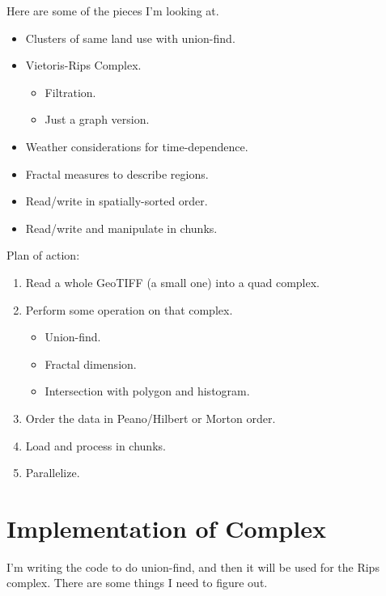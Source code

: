 \documentclass{article}
\begin{document}
Here are some of the pieces I'm looking at.

\begin{itemize}

  \item Clusters of same land use with union-find.

  \item Vietoris-Rips Complex.
  \begin{itemize}
    \item Filtration.
    \item Just a graph version.
  \end{itemize}

  \item Weather considerations for time-dependence.

  \item Fractal measures to describe regions.

  \item Read/write in spatially-sorted order.

  \item Read/write and manipulate in chunks.

\end{itemize}

Plan of action:

\begin{enumerate}

  \item Read a whole GeoTIFF (a small one) into a quad complex.
  \item Perform some operation on that complex.
  \begin{itemize}
    \item Union-find.
    \item Fractal dimension.
    \item Intersection with polygon and histogram.
  \end{itemize}
  \item Order the data in Peano/Hilbert or Morton order.
  \item Load and process in chunks.
  \item Parallelize.

\end{enumerate}


\section{Implementation of Complex}
I'm writing the code to do union-find, and then it will be used for the Rips
complex. There are some things I need to figure out.
\end{document}
